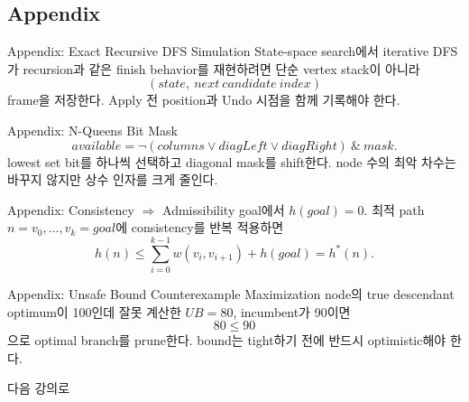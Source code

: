 \subsection{Appendix}
\begin{frame}{Appendix: Exact Recursive DFS Simulation}
State-space search에서 iterative DFS가 recursion과 같은 finish behavior를 재현하려면 단순 vertex stack이 아니라
\[
(state,\ next\ candidate\ index)
\]
frame을 저장한다. Apply 전 position과 Undo 시점을 함께 기록해야 한다.
\end{frame}
\begin{frame}{Appendix: N-Queens Bit Mask}
\[
available=\neg(columns\lor diagLeft\lor diagRight)\ \&\ mask.
\]
lowest set bit를 하나씩 선택하고 diagonal mask를 shift한다. node 수의 최악 차수는 바꾸지 않지만 상수 인자를 크게 줄인다.
\end{frame}
\begin{frame}{Appendix: Consistency \(\Rightarrow\) Admissibility}
goal에서 \(h(goal)=0\). 최적 path \(n=v_0,\ldots,v_k=goal\)에 consistency를 반복 적용하면
\[
h(n)\le\sum_{i=0}^{k-1}w(v_i,v_{i+1})+h(goal)=h^*(n).
\]
\end{frame}
\begin{frame}{Appendix: Unsafe Bound Counterexample}
Maximization node의 true descendant optimum이 100인데 잘못 계산한 \(UB=80\), incumbent가 90이면
\[
80\le90
\]
으로 optimal branch를 prune한다. bound는 tight하기 전에 반드시 optimistic해야 한다.
\end{frame}
\begin{frame}{다음 강의로}
\end{frame}
